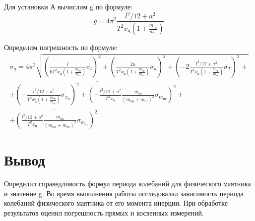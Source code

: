 \documentclass[a4paper,12pt]{article}
\begin{document}
Для установки А вычислим g по формуле:
\begin{equation}
g = 4 \pi^{2} \frac{l^{2}/12 + a^{2}}{T^{2}x_{\mbox{ц}}(1+\frac{m_{\mbox{пр}}}{m_{\mbox{ст}}})}
\end{equation}

Определим погрешность по формуле:
\begin{eqnarray}
\sigma_{g} = 4\pi^{2} \sqrt{ (\frac{l}{6T^{2}x_{\mbox{ц}}(1+\frac{m_{\mbox{пр}}}{m_{\mbox{ст}}})}\sigma_{l})^{2} + (\frac{2a}{T^{2}x_{\mbox{ц}}(1+\frac{m_{\mbox{пр}}}{m_{\mbox{ст}}})}\sigma_{a})^{2} + (-2\frac{l^{2}/12 + a^{2}}{T^{3}x_{\mbox{ц}}(1+\frac{m_{\mbox{пр}}}{m_{\mbox{ст}}})} \sigma_{T})^{2}+}\nonumber \\
\overline{+ (-\frac{l^{2}/12 + a^{2}}{T^{2}x_{\mbox{ц}}^2(1+\frac{m_{\mbox{пр}}}{m_{\mbox{ст}}})}\sigma_{x_{\mbox{ц}}})^{2} + (-\frac{l^{2}/12 + a^{2}}{T^{2}x_{\mbox{ц}}}\frac{m_{\mbox{ст}}}{(m_{\mbox{пр}} + m_{\mbox{ст}})^2}\sigma_{m_{\mbox{пр}}})^{2}+}\nonumber \\
\overline{+ (\frac{l^{2}/12 + a^{2}}{T^{2}x_{\mbox{ц}}}\frac{m_{\mbox{пр}}}{(m_{\mbox{пр}} + m_{\mbox{ст}})^2}\sigma_{m_{\mbox{ст}}})^{2}}
\end{eqnarray}

\section{Вывод}
Определил справедливость формул периода колебаний для физического маятника и значение g. Во время выполнения работы исследовалал зависимость периода колебаний физического маятника от его момента инерции. При обработке результатов оценил погрешность прямых и косвенных измерений.
\end{document}
